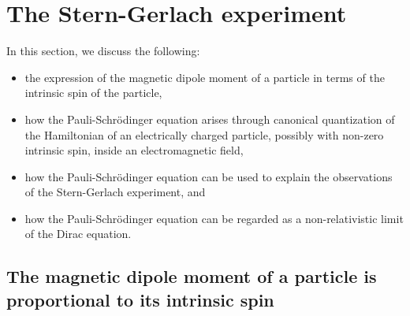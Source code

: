 


\chapter{The Stern-Gerlach experiment}
\setcounter{theorem}{0}
\setcounter{equation}{0}


\renewcommand{\theenumi}{\roman{enumi}}
\renewcommand{\labelenumi}{\textnormal{(\theenumi)}$\;\;$}


In this section, we discuss the following:
\begin{itemize}
\item
    the expression of the magnetic dipole moment of a particle
    in terms of the intrinsic spin of the particle,
\item
    how the Pauli-Schrödinger equation arises through canonical quantization
    of the Hamiltonian of an electrically charged particle,
    possibly with non-zero intrinsic spin, inside an electromagnetic field, 
\item
    how the Pauli-Schrödinger equation can be used to explain the observations
    of the Stern-Gerlach experiment, and
\item
    how the Pauli-Schrödinger equation can be regarded as a non-relativistic limit
    of the Dirac equation.
\end{itemize}


\vskip 0.5cm
\section{The magnetic dipole moment of a particle is proportional to its intrinsic spin}



